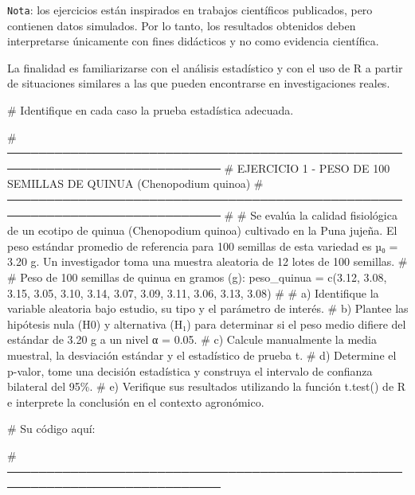 \documentclass[
  spanish,
  letterpaper,
  DIV=11,
  numbers=noendperiod]{scrreprt}
\newenvironment{Shaded}{\begin{snugshade}}{\end{snugshade}}
\newcommand{\CommentTok}[1]{\textcolor[rgb]{0.37,0.37,0.37}{#1}}
\newcommand{\FloatTok}[1]{\textcolor[rgb]{0.68,0.00,0.00}{#1}}
\newcommand{\FunctionTok}[1]{\textcolor[rgb]{0.28,0.35,0.67}{#1}}
\newcommand{\NormalTok}[1]{\textcolor[rgb]{0.00,0.23,0.31}{#1}}
\newcommand{\OtherTok}[1]{\textcolor[rgb]{0.00,0.23,0.31}{#1}}
\begin{document}
\texttt{Nota}: los ejercicios están inspirados en trabajos científicos
publicados, pero contienen datos simulados. Por lo tanto, los resultados
obtenidos deben interpretarse únicamente con fines didácticos y no como
evidencia científica.

La finalidad es familiarizarse con el análisis estadístico y con el uso
de R a partir de situaciones similares a las que pueden encontrarse en
investigaciones reales.

\begin{Shaded}
\begin{Highlighting}[]

\CommentTok{\# Identifique en cada caso la prueba estadística adecuada.}


\CommentTok{\# ─────────────────────────────────────────────────────────────────────────────}
\CommentTok{\# EJERCICIO 1 {-} PESO DE 100 SEMILLAS DE QUINUA (Chenopodium quinoa)}
\CommentTok{\# ─────────────────────────────────────────────────────────────────────────────}
\CommentTok{\#}
\CommentTok{\# Se evalúa la calidad fisiológica de un ecotipo de quinua (Chenopodium quinoa) cultivado en la Puna jujeña. El peso estándar promedio de referencia para 100 semillas de esta variedad es µ₀ = 3.20 g. Un investigador toma una muestra aleatoria de 12 lotes de 100 semillas.}
\CommentTok{\#}
\CommentTok{\# Peso de 100 semillas de quinua en gramos (g):}
\NormalTok{peso\_quinua }\OtherTok{=} \FunctionTok{c}\NormalTok{(}\FloatTok{3.12}\NormalTok{, }\FloatTok{3.08}\NormalTok{, }\FloatTok{3.15}\NormalTok{, }\FloatTok{3.05}\NormalTok{, }\FloatTok{3.10}\NormalTok{, }\FloatTok{3.14}\NormalTok{, }\FloatTok{3.07}\NormalTok{, }\FloatTok{3.09}\NormalTok{, }\FloatTok{3.11}\NormalTok{, }\FloatTok{3.06}\NormalTok{, }\FloatTok{3.13}\NormalTok{, }\FloatTok{3.08}\NormalTok{)}
\CommentTok{\#}
\CommentTok{\# a) Identifique la variable aleatoria bajo estudio, su tipo y el parámetro de interés.}
\CommentTok{\# b) Plantee las hipótesis nula (H0) y alternativa (H₁) para determinar si el peso medio difiere del estándar de 3.20 g a un nivel α = 0.05.}
\CommentTok{\# c) Calcule manualmente la media muestral, la desviación estándar y el estadístico de prueba t.}
\CommentTok{\# d) Determine el p{-}valor, tome una decisión estadística y construya el intervalo de confianza bilateral del 95\%.}
\CommentTok{\# e) Verifique sus resultados utilizando la función t.test() de R e interprete la conclusión en el contexto agronómico.}

\CommentTok{\# Su código aquí:}

\CommentTok{\# ─────────────────────────────────────────────────────────────────────────────}



\end{Highlighting}
\end{Shaded}
\end{document}
